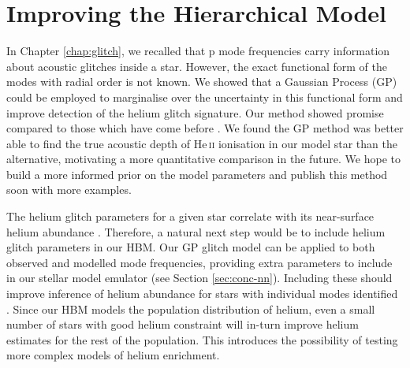 \section{Improving the Hierarchical Model}

In Chapter \ref{chap:glitch}, we recalled that p mode frequencies carry information about acoustic glitches inside a star. However, the exact functional form of the modes with radial order is not known. We showed that a Gaussian Process (GP) could be employed to marginalise over the uncertainty in this functional form and improve detection of the helium glitch signature. Our method showed promise compared to those which have come before \citep[e.g.][]{Verma.Raodeo.ea2019}. We found the GP method was better able to find the true acoustic depth of He\,\textsc{ii} ionisation in our model star than the alternative, motivating a more quantitative comparison in the future. We hope to build a more informed prior on the model parameters and publish this method soon with more examples.

The helium glitch parameters for a given star correlate with its near-surface helium abundance \citep{Houdek.Gough2007}. Therefore, a natural next step would be to include helium glitch parameters in our HBM. Our GP glitch model can be applied to both observed and modelled mode frequencies, providing extra parameters to include in our stellar model emulator (see Section \ref{sec:conc-nn}). Including these should improve inference of helium abundance for stars with individual modes identified \citep[e.g.][]{Davies.SilvaAguirre.ea2016,Lund.SilvaAguirre.ea2017}. Since our HBM models the population distribution of helium, even a small number of stars with good helium constraint will in-turn improve helium estimates for the rest of the population. This introduces the possibility of testing more complex models of helium enrichment.


